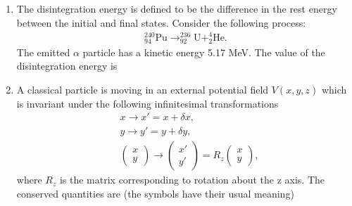 \documentclass[14pt, a4paper]{extarticle}
\begin{document}
\begin{enumerate}[label=\textbf{Q. \arabic*}, start=21]
\item The disintegration energy is defined to be the difference in the rest energy between the initial and final states.
Consider the following process:
\begin{align*} ^{240}_{94}\text{Pu} \rightarrow ^{236}_{92}\text{U} + ^{4}_{2}\text{He}. \end{align*}
The emitted $\alpha$ particle has a kinetic energy 5.17 MeV. The value of the disintegration energy is
\begin{enumerate}
\end{enumerate}

\item A classical particle is moving in an external potential field $V(x,y,z)$ which is invariant under the following infinitesimal transformations
\begin{align*}
& x \rightarrow x' = x + \delta x, \\
& y \rightarrow y' = y + \delta y, \\
& \begin{pmatrix} x \\ y \end{pmatrix} \rightarrow \begin{pmatrix} x' \\ y' \end{pmatrix} = R_z \begin{pmatrix} x \\ y \end{pmatrix},
\end{align*}
where $R_z$ is the matrix corresponding to rotation about the z axis.
The conserved quantities are (the symbols have their usual meaning)
\begin{enumerate}
\end{enumerate}


\end{enumerate}
\end{document}
